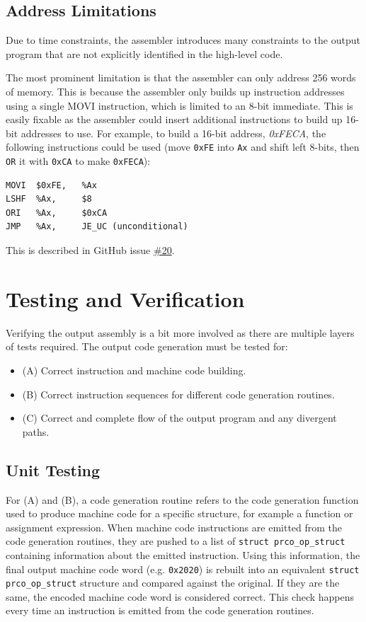 \documentclass[11pt,a4paper]{report}
\begin{document}
\subsection{Address Limitations}
Due to time constraints, the assembler introduces many constraints to the output program that are not explicitly identified in the high-level code.

The most prominent limitation is that the assembler can only address 256 words of memory. This is because the assembler only builds up instruction addresses using a single MOVI instruction, which is limited to an 8-bit immediate. This is easily fixable as the assembler could insert additional instructions to build up 16-bit addresses to use. For example, to build a 16-bit address, \textit{0xFECA}, the following instructions could be used (move \verb|0xFE| into \verb|Ax| and shift left 8-bits, then \verb|OR| it with \verb|0xCA| to make \verb|0xFECA|):
\begin{verbatim}
MOVI  $0xFE,   %Ax
LSHF  %Ax,     $8
ORI   %Ax,     $0xCA
JMP   %Ax,     JE_UC (unconditional)
\end{verbatim}
This is described in GitHub issue \href{https://github.com/bendl/prco304/issues/20}{\#20}.

\section{Testing and Verification}
Verifying the output assembly is a bit more involved as there are multiple layers of tests required. The output code generation must be tested for:
\begin{itemize}
\item{(A) Correct instruction and machine code building.}
\item{(B) Correct instruction sequences for different code generation routines.}
\item{(C) Correct and complete flow of the output program and any divergent paths.}
\end{itemize}

\subsection*{Unit Testing}
For (A) and (B), a code generation routine refers to the code generation function used to produce machine code for a specific structure, for example a function or assignment expression. When machine code instructions are emitted from the code generation routines, they are pushed to a list of \texttt{struct prco_op_struct} containing information about the emitted instruction. Using this information, the final output machine code word (e.g. \texttt{0x2020}) is rebuilt into an equivalent \texttt{struct prco_op_struct} structure and compared against the original. If they are the same, the encoded machine code word is considered correct. This check happens every time an instruction is emitted from the code generation routines.
\end{document}
